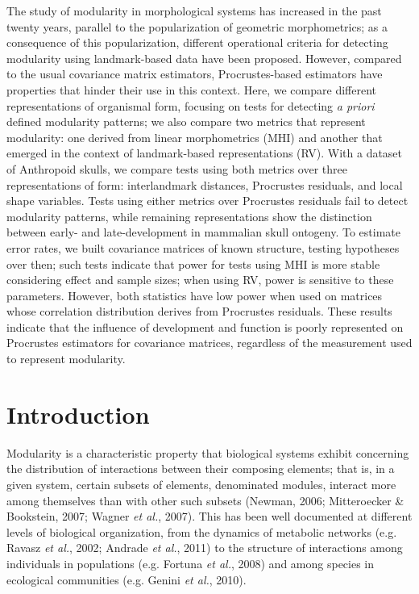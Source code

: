 \documentclass[12pt,twoside]{report}
\begin{document}
The study of modularity in morphological systems has increased in the
past twenty years, parallel to the popularization of geometric
morphometrics; as a consequence of this popularization, different
operational criteria for detecting modularity using landmark-based data
have been proposed. However, compared to the usual covariance matrix
estimators, Procrustes-based estimators have properties that hinder
their use in this context. Here, we compare different representations of
organismal form, focusing on tests for detecting \emph{a priori} defined
modularity patterns; we also compare two metrics that represent
modularity: one derived from linear morphometrics (MHI) and another that
emerged in the context of landmark-based representations (RV). With a
dataset of Anthropoid skulls, we compare tests using both metrics over
three representations of form: interlandmark distances, Procrustes
residuals, and local shape variables. Tests using either metrics over
Procrustes residuals fail to detect modularity patterns, while remaining
representations show the distinction between early- and late-development
in mammalian skull ontogeny. To estimate error rates, we built
covariance matrices of known structure, testing hypotheses over then;
such tests indicate that power for tests using MHI is more stable
considering effect and sample sizes; when using RV, power is sensitive
to these parameters. However, both statistics have low power when used
on matrices whose correlation distribution derives from Procrustes
residuals. These results indicate that the influence of development and
function is poorly represented on Procrustes estimators for covariance
matrices, regardless of the measurement used to represent modularity.

\section{Introduction}\label{introduction}

Modularity is a characteristic property that biological systems exhibit
concerning the distribution of interactions between their composing
elements; that is, in a given system, certain subsets of elements,
denominated modules, interact more among themselves than with other such
subsets (Newman, 2006; Mitteroecker \& Bookstein, 2007; Wagner \emph{et
al.}, 2007). This has been well documented at different levels of
biological organization, from the dynamics of metabolic networks (e.g.
Ravasz \emph{et al.}, 2002; Andrade \emph{et al.}, 2011) to the
structure of interactions among individuals in populations (e.g. Fortuna
\emph{et al.}, 2008) and among species in ecological communities (e.g.
Genini \emph{et al.}, 2010).
\end{document}
